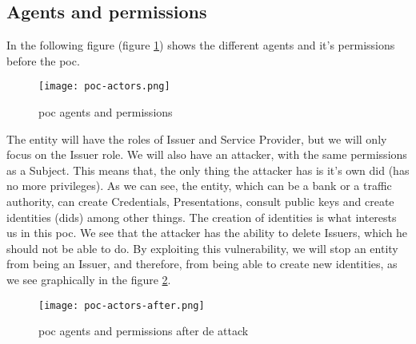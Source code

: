     \subsection{Agents and permissions}
        In the following figure (figure \ref{fig:poc-actors}) shows the different agents and it's permissions before the \acrshort{poc}.\\ 
        \begin{figure}[h]
            \centering
            \texttt{[image: poc-actors.png]}
            \caption{\acrshort{poc} agents and permissions}
            \label{fig:poc-actors}
        \end{figure}
        
        The entity will have the roles of Issuer and Service Provider, but we will only focus on the Issuer role. We will also have an attacker, with the same permissions as a Subject. This means that, the only thing the attacker has is it's own \acrshort{did} (has no more privileges). As we can see, the entity, which can be a bank or a traffic authority, can create Credentials, Presentations, consult public keys and create identities (\acrshort{did}s) among other things. The creation of identities is what interests us in this \acrshort{poc}. We see that the attacker has the ability to delete Issuers, which he should not be able to do. By exploiting this vulnerability, we will stop an entity from being an Issuer, and therefore, from being able to create new identities, as we see graphically in the figure \ref{fig:poc-actors-after}.
        
        \begin{figure}[h]
            \centering
            \texttt{[image: poc-actors-after.png]}
            \caption{\acrshort{poc} agents and permissions after de attack}
            \label{fig:poc-actors-after}
        \end{figure}

